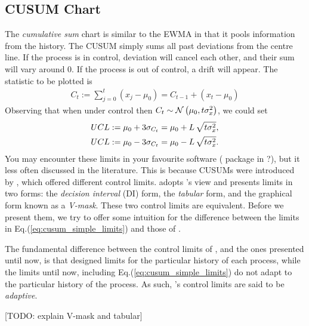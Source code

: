 \subsection{CUSUM Chart}
The \emph{cumulative sum} chart is similar to the EWMA in that it pools information from the history. 
The CUSUM simply sums all past deviations from the centre line.
If the process is in control, deviation will cancel each other, and their sum will vary around $0$. 
If the process is out of control, a drift will appear. 
The statistic to be plotted is 
\begin{align}
	C_t:= \sum_{j=0}^{t}(x_j-\mu_0)=C_{t-1}+ (x_t-\mu_0)
\end{align} 
Observing that when under control then $C_t \sim \mathcal{N}\left(\mu_0, t \sigma_x^2\right)$, we could set 
\begin{align}
\label{eq:cusum_simple_limits}
\begin{split}
	UCL &:= \mu_0 + 3 \sigma_{C_t}= \mu_0 + L \, \sqrt{t \sigma_x^2},  \\
	UCL &:= \mu_0 - 3 \sigma_{C_t}= \mu_0 - L \, \sqrt{t \sigma_x^2}.
\end{split}
\end{align}
You may encounter these limits in your favourite software ( package in \R?), but it less often discussed in the literature. 
This is because CUSUMs were introduced by \cite{page_continuous_1954}, which offered different control limits. 
\cite{montgomery_introduction_2007} adopts \citeauthor{page_continuous_1954}'s view and presents limits in two forms: the \emph{decision interval} (DI) form, \aka the \emph{tabular} form, and the graphical form known as a \emph{V-mask}.
These two control limits are equivalent. Before we present them, we try to offer some intuition for the difference between the limits in Eq.(\ref{eq:cusum_simple_limits}) and those of \cite{page_continuous_1954}.

The fundamental difference between the control limits of \cite{page_continuous_1954}, and the ones presented until now, is that \citeauthor{page_continuous_1954} designed limits for the particular history of each process, while the limits until now, including Eq.(\ref{eq:cusum_simple_limits}) do not adapt to the particular history of the process.
As such, \citeauthor{page_continuous_1954}'s control limits are said to be \emph{adaptive}.

[TODO: explain V-mask and tabular]





